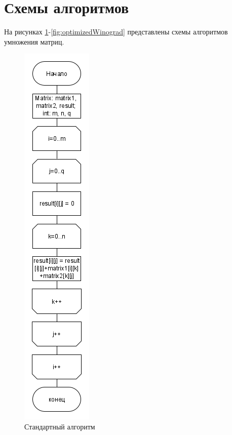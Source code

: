 \section{Схемы алгоритмов}
\label{sec:schemes}
На рисунках \ref{fig:standard}-\ref{fig:optimizedWinograd} представлены схемы алгоритмов умножения матриц.
\begin{figure}[H]
	\centering
	\includegraphics[height=0.7\textheight]{src/standard}
	\caption{Стандартный алгоритм}
	\label{fig:standard}
\end{figure}
